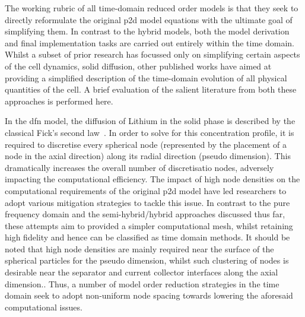The working rubric of all time-domain reduced  order models is that they seek to
directly reformulate  the original \gls{p2d}  model equations with  the ultimate
goal  of simplifying  them. In  contrast to  the hybrid  models, both  the model
derivation and  final implementation tasks  are carried out entirely  within the
time domain. Whilst a subset of  prior research has focussed only on simplifying
certain aspects  of the  cell dynamics, \eg{}  solid diffusion,  other published
works  have aimed  at  providing  a simplified  description  of the  time-domain
evolution of  all physical  quantities of  the cell. A  brief evaluation  of the
salient literature from both these approaches is performed here.

In the \gls{dfn} model, the diffusion of Lithium in the solid phase is described
by the classical  Fick's second law~\cite{Fick1995}. In order to  solve for this
concentration  profile,  it  is  required to  discretise  every  spherical  node
(represented by the placement of a node in the axial direction) along its radial
direction (pseudo dimension). This dramatically  increases the overall number of
discretisatio  nodes,  adversely  impacting the  computational  efficiency.  The
impact of high node densities on  the computational requirements of the original
\gls{p2d}  model have  led researchers  to adopt  various mitigation  strategies
to  tackle  this  issue. In  contrast  to  the  pure  frequency domain  and  the
semi-hybrid/hybrid approaches discussed thus far, these attempts aim to provided
a  simpler computational  mesh, whilst  retaining  high fidelity  and hence  can
be  classified  as time  domain  methods.  It should  be  noted  that high  node
densities are  mainly required near the  surface of the spherical  particles for
the  pseudo   dimension,  whilst  such  clustering of  nodes  is
desirable near  the separator and  current collector interfaces along  the axial
dimension..  Thus, a
number  of  model  order  reduction  strategies  in  the  time  domain  seek  to
adopt  non-uniform node  spacing  towards lowering  the aforesaid  computational
issues.

